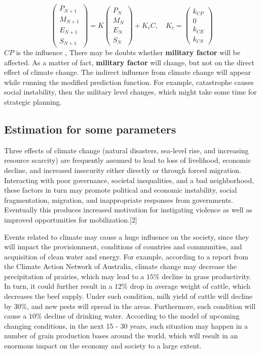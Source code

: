 \documentclass{mcmthesis}
\begin{document}
	$$
	\left(
	\begin{matrix}
	P_{N+1} \\ M_{N+1} \\ E_{N+1} \\ S_{N+1}
	\end{matrix}
	\right) 
	= 
	K 
	\left(
	\begin{matrix}
	P_N \\ M_N \\ E_N \\ S_N
	\end{matrix}
	\right) 
	+
	K_c
	C
	, \quad
	K_c = 
	\left(
	\begin{matrix}
	k_{CP} \\ {0} \\ k_{CE} \\ k_{CS}
	\end{matrix}
	\right)
	$$
	$CP$ is the influence , There may be doubts whether \textbf{military factor} will be affected. As a matter of fact, \textbf{military factor} will change, but not on the direct effect of climate change. The indirect influence from climate change will appear while running the modified prediction function. For example, catastrophe causes social instability, then the military level changes, which might take some time for strategic planning.
	
	
	\subsection{Estimation for some parameters}
	Three effects of climate change (natural disasters, sea-level rise, and increasing resource scarcity) are frequently assumed to lead to loss of livelihood, economic decline, and increased insecurity either directly or through forced migration. Interacting with poor governance, societal inequalities, and a bad neighborhood, these factors in turn may promote
	political and economic instability, social fragmentation, migration, and inappropriate responses from governments. Eventually this produces increased motivation for instigating violence as well as improved opportunities for mobilization.[2]
	
	Events related to climate may cause a huge influence on the society, since they will impact the provisionment, conditions of countries and communities, and acquisition of clean water and energy. For example, according to a report from the Climate Action Network of Australia, climate change may decrease the precipitation of prairies, which may lead to a $15\%$ decline in grass productivity. In turn, it could further result in a $12\%$ drop in average weight of cattle, which decreases the beef supply. Under such condition, milk yield of cattle will decline by $30\%$, and new pests will spread in the areas. Furthermore, such condition will cause a $10\%$ decline of drinking water. According to the model of upcoming changing conditions, in the next 15 - 30 years, such situation may happen in a number of grain production bases around the world, which will result in an enormous impact on the economy and society to a large extent. 
	
\end{document}
